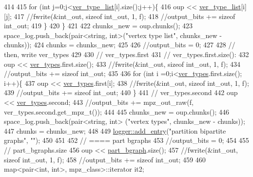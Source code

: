 \begin{DoxyCode}
414 
415     \textcolor{keywordflow}{for} (\textcolor{keywordtype}{int} j=0;j<\hyperlink{classmarked__graph__compressed_af2e3e55223d436628a02758dfae88493}{ver\_type\_list}[i].size();j++)\{
416       oup << \hyperlink{classmarked__graph__compressed_af2e3e55223d436628a02758dfae88493}{ver\_type\_list}[i][j];
417       \textcolor{comment}{//fwrite(&int\_out, sizeof int\_out, 1, f);}
418       \textcolor{comment}{//output\_bits += sizeof int\_out;}
419     \}
420   \}
421 
422   chunks\_new = oup.chunks();
423   space\_log.push\_back(pair<string, int>(\textcolor{stringliteral}{"vertex type list"}, chunks\_new - chunks));
424   chunks = chunks\_new;
425 
426   \textcolor{comment}{//output\_bits = 0;}
427   
428   \textcolor{comment}{// then, write ver\_types}
429 
430   \textcolor{comment}{// ver\_types.first}
431   \textcolor{comment}{// ver\_types.first.size():}
432   oup << \hyperlink{classmarked__graph__compressed_af446cc5e23c241a92b76642fd5ebc403}{ver\_types}.first.size();
433   \textcolor{comment}{//fwrite(&int\_out, sizeof int\_out, 1, f);}
434   \textcolor{comment}{//output\_bits += sizeof int\_out;}
435 
436   \textcolor{keywordflow}{for} (\textcolor{keywordtype}{int} i =0;i<\hyperlink{classmarked__graph__compressed_af446cc5e23c241a92b76642fd5ebc403}{ver\_types}.first.size(); i++)\{
437     oup <<  \hyperlink{classmarked__graph__compressed_af446cc5e23c241a92b76642fd5ebc403}{ver\_types}.first[i];
438     \textcolor{comment}{//fwrite(&int\_out, sizeof int\_out, 1, f);}
439     \textcolor{comment}{//output\_bits += sizeof int\_out;}
440   \}
441   \textcolor{comment}{// ver\_types.second}
442   oup << \hyperlink{classmarked__graph__compressed_af446cc5e23c241a92b76642fd5ebc403}{ver\_types}.second;
443   \textcolor{comment}{//output\_bits += mpz\_out\_raw(f, ver\_types.second.get\_mpz\_t());}
444 
445   chunks\_new = oup.chunks();
446   space\_log.push\_back(pair<string, int> (\textcolor{stringliteral}{"vertex types"}, chunks\_new - chunks));
447   chunks = chunks\_new;
448 
449   \hyperlink{classlogger_a710163deb17bc81f70d53d285b8ac9ac}{logger::add\_entry}(\textcolor{stringliteral}{"partition bipartite graphs"}, \textcolor{stringliteral}{""});
450   
451 
452   \textcolor{comment}{// ==== part bgraphs}
453   \textcolor{comment}{//output\_bits = 0;}
454 
455   \textcolor{comment}{// part\_bgraphs.size}
456   oup << \hyperlink{classmarked__graph__compressed_a7b3267063fba30b45eb21b3ba4e07536}{part\_bgraph}.size();
457   \textcolor{comment}{//fwrite(&int\_out, sizeof int\_out, 1, f);}
458   \textcolor{comment}{//output\_bits += sizeof int\_out;}
459 
460   map<pair<int, int>, mpz\_class>::iterator it2;

\end{DoxyCode}
